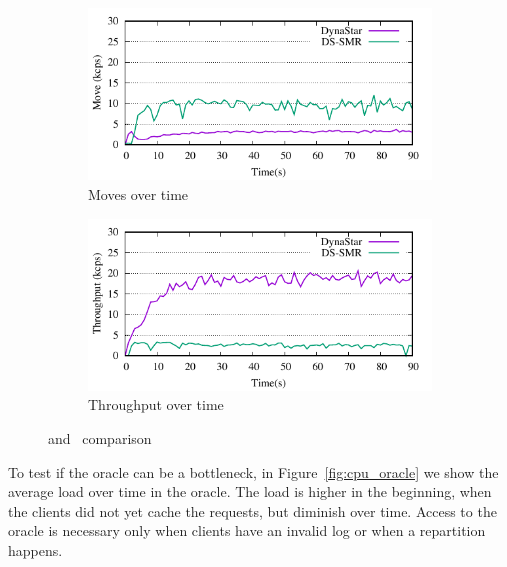 \begin{figure}
\captionsetup{justification=centering}
\centering
	\begin{subfigure}[ht]{0.5\textwidth}
		\includegraphics{figures/experiments/move-dynastar-vs-dssmr-4p}
		\caption{Moves over time}
		\label{fig:4p_moves}
	\end{subfigure}

\begin{subfigure}[ht]{0.5\textwidth}
	\includegraphics{figures/experiments/tp-dynastar-vs-dssmr-4p}
	\caption{Throughput over time}
	\label{fig:4p_tput}
\end{subfigure}
\caption{\dynastar and \dssmr\ comparison}
\label{fig:move_throughput_dssmr_vs_dynastar}
\end{figure}

To test if the oracle can be a bottleneck, in Figure~\ref{fig:cpu_oracle} we show the average load over time in the oracle.
The load is higher in the beginning, when the clients did not yet cache the requests, but diminish over time. Access to the
oracle is necessary only when clients have an invalid log or when a repartition happens.

